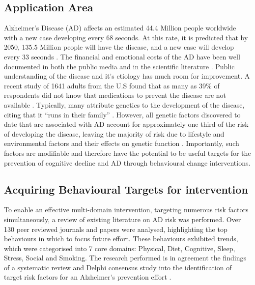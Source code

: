 \subsection{Application Area}
Alzheimer's Disease (AD) affects an estimated 44.4 Million people worldwide with a new case developing every 68 seconds. At this rate, it is predicted that by 2050, 135.5 Million people will have the disease, and a new case will develop every 33 seconds \cite{Thies2013}. The financial and emotional costs of the AD have been well documented in both the public media and in the scientific literature \cite{Alz2010, Hurd2013}. Public understanding of the disease and it's etiology has much room for improvement. A recent study of 1641 adults from the U.S found that as many as 39\% of respondents did not know that medications to prevent the disease are not available \cite{Roberts2014}. Typically, many attribute genetics to the development of the disease, citing that it ``runs in their family'' \cite{Lock2006, Roberts2014}. However, all genetic factors discovered to date that are associated with AD account for approximately one third of the risk of developing the disease, leaving the majority of risk due to lifestyle and environmental factors and their effects on genetic function \cite{Ridge2013}. Importantly, such factors are modifiable and therefore have the potential to be useful targets for the prevention of cognitive decline and AD through behavioural change interventions.

\subsection{Acquiring Behavioural Targets for intervention} \label{section-acquiring-targets}
To enable an effective multi-domain intervention, targeting numerous risk factors simultaneously, a review of existing literature on AD risk was performed. Over 130 peer reviewed journals and papers were analysed, highlighting the top behaviours in which to focus future effort. These behaviours exhibited trends, which were categorised into 7 core domains: Physical, Diet, Cognitive, Sleep, Stress, Social and Smoking. The research performed is in agreement the findings of a systematic review and Delphi consensus study into the identification of target risk factors for an Alzheimer's prevention effort \cite{Deckers2015}.

